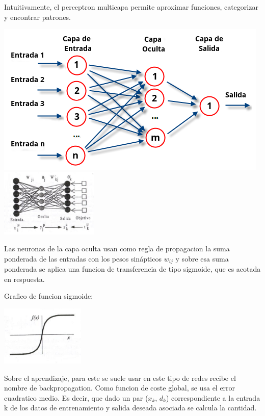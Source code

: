 Intuitivamente, el perceptron multicapa permite aproximar funciones, categorizar y encontrar patrones.

\begin{center}
\includegraphics{img/pmulticapa}
\includegraphics[width=0.35\textwidth]{img/pmulticapa2}
\end{center}

Las neuronas de la capa oculta usan como regla de propagacion la suma ponderada de las entradas con los pesos sinápticos $w_{ij}$ y sobre esa suma ponderada se aplica una funcion de transferencia de tipo sigmoide, que es acotada en respuesta.

\newpage
Grafico de funcion sigmoide:

\begin{center}
\includegraphics[width=0.30\textwidth]{img/sigmoide}
\end{center}

Sobre el aprendizaje, para este se suele usar en este tipo de redes recibe el nombre de backpropagation. Como funcion de coste global, se usa el error cuadratico medio. Es decir, que dado un par ($x_k$, $d_k$) correspondiente a la entrada k de los datos de entrenamiento y salida deseada asociada se calcula la cantidad.


